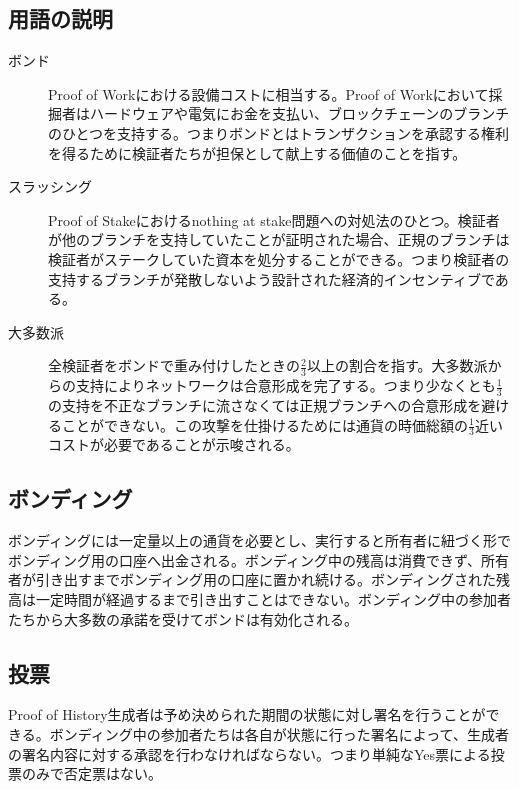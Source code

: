 \documentclass[12pt]{ltjsarticle}
\begin{document}
\subsection{用語の説明}
\begin{description}

\item[ボンド]
Proof of Workにおける設備コストに相当する。Proof of Workにおいて採掘者はハードウェアや電気にお金を支払い、ブロックチェーンのブランチのひとつを支持する。つまりボンドとはトランザクションを承認する権利を得るために検証者たちが担保として献上する価値のことを指す。

\item[スラッシング]

Proof of Stakeにおけるnothing at stake問題への対処法のひとつ\cite{slasher}。検証者が他のブランチを支持していたことが証明された場合、正規のブランチは検証者がステークしていた資本を処分することができる。つまり検証者の支持するブランチが発散しないよう設計された経済的インセンティブである。

\item[大多数派]
全検証者をボンドで重み付けしたときの\(\frac{2}{3}\)以上の割合を指す。大多数派からの支持によりネットワークは合意形成を完了する。つまり少なくとも\(\frac{1}{3}\)の支持を不正なブランチに流さなくては正規ブランチへの合意形成を避けることができない。この攻撃を仕掛けるためには通貨の時価総額の\(\frac{1}{3}\)近いコストが必要であることが示唆される。

\end{description}

\subsection{ボンディング}
ボンディングには一定量以上の通貨を必要とし、実行すると所有者に紐づく形でボンディング用の口座へ出金される。ボンディング中の残高は消費できず、所有者が引き出すまでボンディング用の口座に置かれ続ける。ボンディングされた残高は一定時間が経過するまで引き出すことはできない。ボンディング中の参加者たちから大多数の承諾を受けてボンドは有効化される。

\subsection{投票}
Proof of History生成者は予め決められた期間の状態に対し署名を行うことができる。ボンディング中の参加者たちは各自が状態に行った署名によって、生成者の署名内容に対する承認を行わなければならない。つまり単純なYes票による投票のみで否定票はない。
\end{document}

